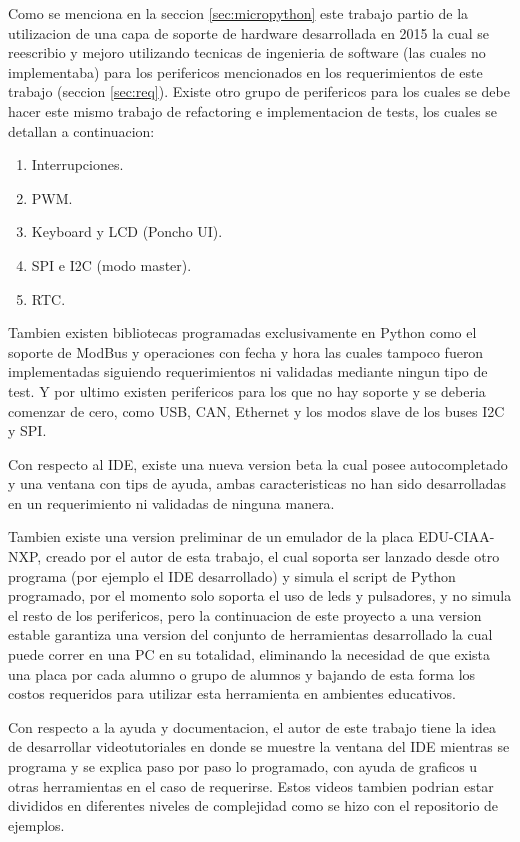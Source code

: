 Como se menciona en la seccion \ref{sec:micropython} este trabajo partio de la utilizacion de una capa de soporte de hardware desarrollada en 2015 la cual se reescribio y mejoro utilizando tecnicas de ingenieria de software (las cuales no implementaba) para los perifericos mencionados en los requerimientos de este trabajo (seccion \ref{sec:req}). Existe otro grupo de perifericos para los cuales se debe hacer este mismo trabajo de refactoring e implementacion de tests, los cuales se detallan a continuacion:

\begin{enumerate}
	\item  Interrupciones.
	\item  PWM.
	\item  Keyboard y LCD (Poncho UI). 
	\item  SPI e I2C (modo master).
	\item  RTC.
\end{enumerate}

Tambien existen bibliotecas programadas exclusivamente en Python como el soporte de ModBus y operaciones con fecha y hora las cuales tampoco fueron implementadas siguiendo requerimientos ni validadas mediante ningun tipo de test. Y por ultimo existen perifericos para los que no hay soporte y se deberia comenzar de cero, como USB, CAN, Ethernet y los modos slave de los buses I2C y SPI.

Con respecto al IDE, existe una nueva version beta la cual posee autocompletado y una ventana con tips de ayuda, ambas caracteristicas no han sido desarrolladas en un requerimiento ni validadas de ninguna manera.

Tambien existe una version preliminar de un emulador de la placa EDU-CIAA-NXP, creado por el autor de esta trabajo, el cual soporta ser lanzado desde otro programa (por ejemplo el IDE desarrollado) y simula el script de Python programado, por el momento solo soporta el uso de leds y pulsadores, y no simula el resto de los perifericos, pero la continuacion de este proyecto a una version estable garantiza una version del conjunto de herramientas desarrollado la cual puede correr en una PC en su totalidad, eliminando la necesidad de que exista una placa por cada alumno o grupo de alumnos y bajando de esta forma los costos requeridos para utilizar esta herramienta en ambientes educativos.

Con respecto a la ayuda y documentacion, el autor de este trabajo tiene la idea de desarrollar videotutoriales en donde se muestre la ventana del IDE mientras se programa y se explica paso por paso lo programado, con ayuda de graficos u otras herramientas en el caso de requerirse. Estos videos tambien podrian estar divididos en diferentes niveles de complejidad como se hizo con el repositorio de ejemplos.

